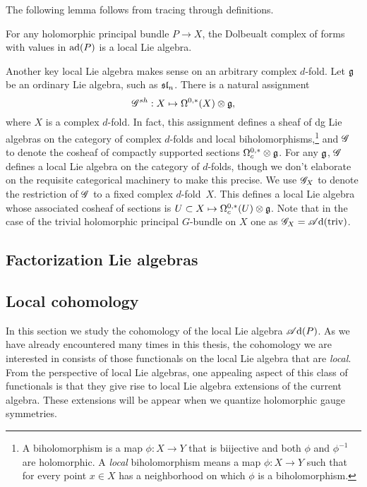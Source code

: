 \documentclass[10pt]{amsart}
\def\sAd{\sA{\rm d}}
\begin{document}
The following lemma follows from tracing through definitions. 

\begin{lem} For any holomorphic principal bundle $P \to X$, the Dolbeualt complex of forms with values in ${\rm ad}(P)$ is a local Lie algebra. 
\end{lem}

\begin{eg}
Another key local Lie algebra makes sense on an arbitrary complex $d$-fold.
Let $\mathfrak g$ be an ordinary Lie algebra, such as ${\frak{s}\frak{l}}_n$.
There is a natural assignment 
\[
\mathscr G^{sh} : X \mapsto \Omega^{0,*}(X) \otimes \mathfrak g,
\]
where $X$ is a complex $d$-fold.
In fact, this assignment defines a sheaf of dg Lie algebras on the category of complex $d$-folds and local biholomorphisms,\footnote{A biholomorphism is a map $\phi: X \to Y$ that is biijective and both $\phi$ and $\phi^{-1}$ are holomorphic. A {\em local} biholomorphism means a map $\phi: X \to Y$ such that for every point $x \in X$ has a neighborhood on which $\phi$ is a biholomorphism.}
and $\mathscr G$ to denote the cosheaf of compactly supported sections $\Omega^{0,*}_c \otimes \mathfrak g$.
For any $\mathfrak g$, $\mathscr G$ defines a local Lie algebra on the category of $d$-folds, though we don't elaborate on the requisite categorical machinery to make this precise.
We use $\mathscr G_X$ to denote the restriction of $\mathscr G$ to a fixed complex $d$-fold~$X$.
This defines a local Lie algebra whose associated cosheaf of sections is $U \subset X \mapsto \Omega^{0,*}_c(U) \otimes \mathfrak g$.
Note that in the case of the trivial holomorphic principal $G$-bundle on $X$ one as $\sG_X = \sAd({\rm triv})$. 
\end{eg}


\subsection{Factorization Lie algebras}
 
\subsection{Local cohomology}

In this section we study the cohomology of the local Lie algebra $\sAd(P)$.
As we have already encountered many times in this thesis, the cohomology we are interested in consists of those functionals on the local Lie algebra that are {\em local}.
From the perspective of local Lie algebras, one appealing aspect of this class of functionals is that they give rise to local Lie algebra extensions of the current algebra.
These extensions will be appear when we quantize holomorphic gauge symmetries.
\end{document}
